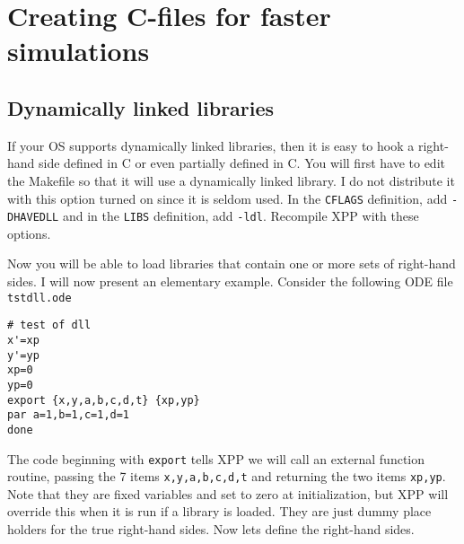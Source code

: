 \documentclass{article}
\begin{document}
\section{Creating C-files for faster simulations}
\subsection{Dynamically linked libraries}
If your OS supports dynamically linked libraries, then it is easy to
hook a right-hand side defined in C or even partially defined in
C. You will first have to edit the Makefile so that it will use  a
dynamically linked library. I do not distribute it with this option
turned on since it is seldom used.  In the {\tt CFLAGS} definition,
add {\tt -DHAVEDLL} and in the {\tt LIBS} definition, add {\tt -ldl}.  
Recompile XPP with these options. 


Now you will be able to load libraries that contain one or more sets
of right-hand sides.  I will now present an
elementary example. Consider the following ODE file {\tt tstdll.ode}
\begin{verbatim}
# test of dll
x'=xp
y'=yp
xp=0
yp=0
export {x,y,a,b,c,d,t} {xp,yp}
par a=1,b=1,c=1,d=1
done

\end{verbatim}
The code beginning with {\tt export} tells XPP we will call an
external function routine, passing the 7 items {\tt x,y,a,b,c,d,t} and
returning the two items {\tt xp,yp}.  Note that they are fixed
variables and set to zero at initialization, but XPP will override
this when it is run if a library is loaded.
  They are just dummy place holders for the true
right-hand sides.  Now lets define the right-hand sides. 
\end{document}
